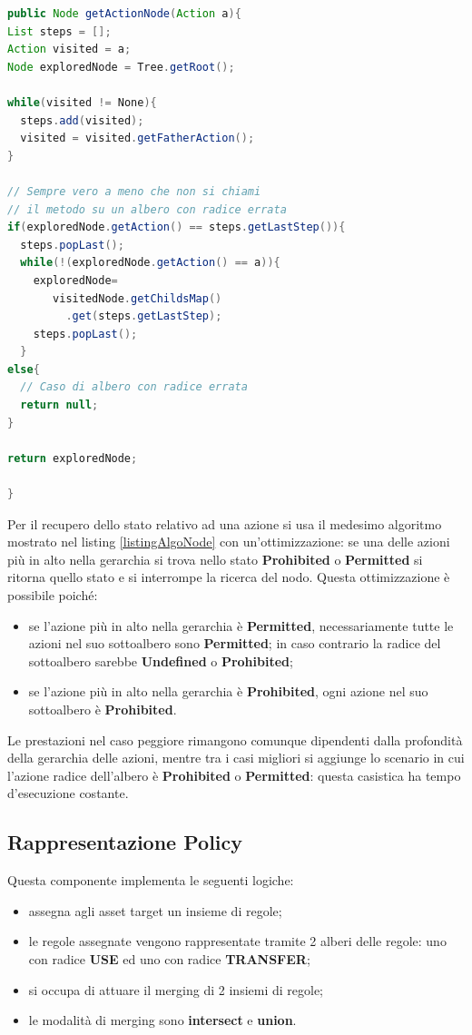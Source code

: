 \documentclass[12pt,a4paper,twoside]{book}
\begin{document}
\begin{lstlisting}[language=java,firstnumber=1,caption={Il caso peggiore per questa ricerca è la profondità della gerarchia delle azioni. Il caso migliore si ha qundo l'azione non è nell'albero, con tempo di risposta costante.},label=listingAlgoNode,captionpos=b]
public Node getActionNode(Action a){
List steps = [];
Action visited = a;
Node exploredNode = Tree.getRoot();

while(visited != None){
  steps.add(visited);
  visited = visited.getFatherAction();
}

// Sempre vero a meno che non si chiami
// il metodo su un albero con radice errata
if(exploredNode.getAction() == steps.getLastStep()){
  steps.popLast();
  while(!(exploredNode.getAction() == a)){
  	exploredNode=
  	   visitedNode.getChildsMap()
  	     .get(steps.getLastStep);
  	steps.popLast();
  }
else{
  // Caso di albero con radice errata
  return null; 
}

return exploredNode;
                
}
\end{lstlisting}
Per il recupero dello stato relativo ad una azione si usa il medesimo algoritmo mostrato nel listing \ref{listingAlgoNode} con un'ottimizzazione: se una delle azioni più in alto nella gerarchia si trova nello stato \textbf{Prohibited} o \textbf{Permitted} si ritorna quello stato e si interrompe la ricerca del nodo. Questa ottimizzazione è possibile poiché:
\begin{itemize}
\item se l'azione più in alto nella gerarchia è \textbf{Permitted}, necessariamente tutte le azioni nel suo sottoalbero sono \textbf{Permitted}; in caso contrario la radice del sottoalbero sarebbe \textbf{Undefined} o \textbf{Prohibited};
\item  se l'azione più in alto nella gerarchia è \textbf{Prohibited}, ogni azione nel suo sottoalbero è \textbf{Prohibited}.
\end{itemize}
Le prestazioni nel caso peggiore rimangono comunque dipendenti dalla profondità della gerarchia delle azioni, mentre tra i casi migliori si aggiunge lo scenario in cui l'azione radice dell'albero è \textbf{Prohibited} o \textbf{Permitted}: questa casistica ha tempo d'esecuzione costante.
\subsection{Rappresentazione Policy}\label{policyRappr}
Questa componente implementa le seguenti logiche:
\begin{itemize}
\item assegna agli asset target un insieme di regole;
\item le regole assegnate vengono rappresentate tramite 2 alberi delle regole: uno con radice \textbf{USE} ed uno con radice \textbf{TRANSFER};
\item si occupa di attuare il merging di 2 insiemi di regole;
\item le modalità di merging sono \textbf{intersect} e \textbf{union}.
\end{itemize}
\end{document}

